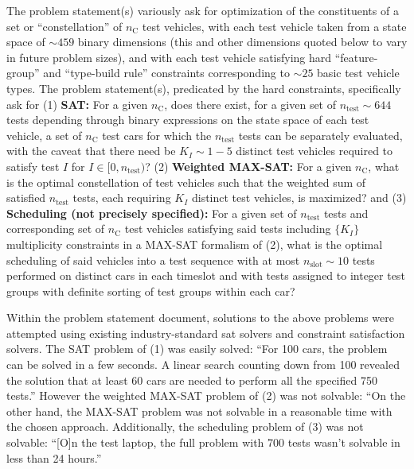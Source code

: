 \documentclass[aps,prl,twocolumn,superscriptaddress,groupedaddress]{revtex4}  %
\begin{document}
The problem statement(s) variously ask for optimization of the constituents of a
set or
``constellation'' of $n_{\mathrm{C}}$ test vehicles, with each test vehicle taken
from a state space of $\sim 459$ binary dimensions (this and other dimensions
quoted below to vary
in future problem sizes), and with each test vehicle 
satisfying hard ``feature-group'' and ``type-build rule'' constraints
corresponding to $\sim 25$ basic test vehicle types. The problem
statement(s), predicated by the hard constraints, specifically ask for
(1) \textbf{SAT:} 
For a given $n_{\mathrm{C}}$, does there exist, for a given set of
$n_{\mathrm{test}} \sim 644$ tests depending through binary expressions on the state
space of each test vehicle, a set of $n_{\mathrm{C}}$ test cars for which the
$n_{\mathrm{test}}$ tests can be separately evaluated, with the caveat 
that there need be $K_I \sim 1-5$ distinct
test vehicles required to satisfy test $I$ for $I \in [0, n_{\mathrm{test}})$?
(2) \textbf{Weighted MAX-SAT:} For a given $n_{\mathrm{C}}$, what is the optimal
constellation of test vehicles such that the weighted sum of satisfied $n_{\mathrm{test}}$
tests, each requiring $K_I$ distinct test vehicles, is maximized? and 
(3) \textbf{Scheduling (not precisely specified):} For a given set of
$n_{\mathrm{test}}$ tests and corresponding set of $n_{\mathrm{C}}$ test
vehicles satisfying said tests including $\{ K_I \}$ multiplicity constraints in
a MAX-SAT formalism of (2), what is the optimal scheduling of said vehicles into 
a test sequence with at most $n_{\mathrm{slot}} \sim 10$ tests performed on
distinct cars in each timeslot and with tests assigned to integer test groups
with definite sorting of test groups within each car?

Within the problem statement document, solutions to the above problems were
attempted using existing industry-standard sat solvers and constraint
satisfaction solvers. The SAT problem of (1) was easily solved:
``For 100 cars, the problem can be solved in a few seconds. A linear search counting down
from 100 revealed the solution that at least 60 cars are needed to perform all the specified
750 tests.''
However the weighted MAX-SAT problem of (2) was not solvable:
``On the other hand, the MAX-SAT problem was not solvable in a reasonable time with the
chosen approach.
Additionally, the scheduling problem of (3) was not solvable:
``[O]n the test laptop, the full problem with 700 tests wasn't solvable in less than 24
hours.''
\end{document}
